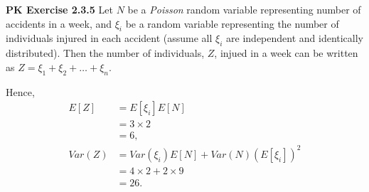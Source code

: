 \documentclass{article}
\begin{document}
\textbf{PK Exercise 2.3.5} 
Let $N$ be a \emph{Poisson} random variable representing number of accidents in a week, 
and $\xi_i$ be a random variable representing the number of individuals injured in each accident (assume all $\xi_i$ are independent and identically distributed).
Then the number of individuals, $Z$, injued in a week can be written as $Z = \xi_1 + \xi_2 + \dots + \xi_n$.

Hence, 
\begin{align}
    E[Z] & = E[\xi_i]E[N] \nonumber \\
    & = 3 \times 2 \nonumber \\
    & = 6, \nonumber \\
    Var(Z) & = Var(\xi_i)E[N] + Var(N)(E[\xi_i])^2 \nonumber \\
    & = 4\times 2 + 2\times 9 \nonumber \\
    & = 26. \nonumber
\end{align}
\bigbreak
\end{document}
